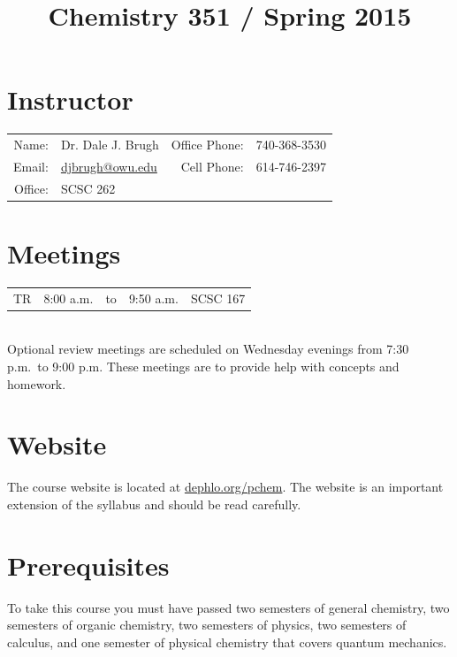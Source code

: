 \documentclass[letterpaper,oneside,onecolumn,11pt,article]{memoir}
\title{Chemistry 351 / Spring 2015}
\date{}
\author{}
\begin{document}
\maketitle
\thispagestyle{courseinformationtitle}
%
%
\section{Instructor}
\begin{tabular}{rl|rl}
Name: & Dr. Dale J. Brugh & Office Phone: & 740-368-3530 \\
Email: & \href{mailto:djbrugh@owu.edu}{djbrugh@owu.edu} & Cell Phone: & 614-746-2397 \\
Office: & SCSC 262 & &  \\
\end{tabular}
%
%
\section{Meetings}
\begin{tabular}{crcrl}
TR & 8:00 a.m. & to & 9:50 a.m. & SCSC 167\\
\end{tabular} \\[0.09in]
Optional review meetings are scheduled on Wednesday evenings from 7:30 p.m.\ to 9:00 p.m. These meetings are to provide help with concepts and homework. 
%
%
\section{Website}
The course website is located at \href{http://dephlo.org/pchem}{dephlo.org/pchem}. The website is an important extension of the syllabus and should be read carefully.
%
%
\section{Prerequisites}
To take this course you must have passed two semesters of general chemistry, two semesters of organic chemistry, two semesters of physics, two semesters of calculus, and one semester of physical chemistry that covers quantum mechanics.
%
%
\end{document}
